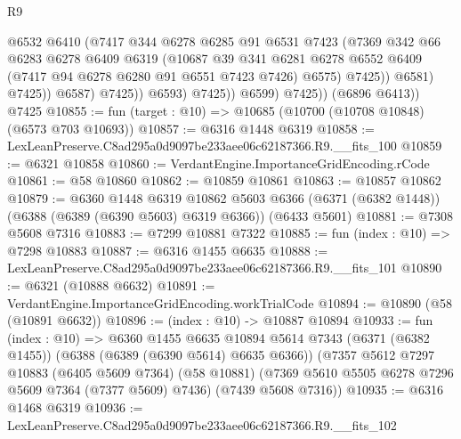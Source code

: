 \begin{lexlean}{R9}
\begin{coremodule}
                              @6532
                              @6410
                              (@7417
                                @344
                                @6278
                                @6285
                                @91
                                @6531
                                @7423
                                (@7369
                                  @342
                                  @66
                                  @6283
                                  @6278
                                  @6409
                                  @6319
                                  (@10687
                                    @39
                                    @341
                                    @6281
                                    @6278
                                    @6552
                                    @6409
                                    (@7417 @94 @6278 @6280 @91 @6551 @7423 @7426)
                                    @6575)
                                  @7425))
                              @6581)
                            @7425))
                        @6587)
                      @7425))
                  @6593)
                @7425))
            @6599)
          @7425))
      (@6896 @6413))
    @7425
@10855 := fun (target : @10) => @10685 (@10700 (@10708 @10848) (@6573 @703 @10693))
@10857 := @6316 @1448 @6319
@10858 := LexLeanPreserve.C8ad295a0d9097be233aee06c62187366.R9.__fits_100
@10859 := @6321 @10858
@10860 := VerdantEngine.ImportanceGridEncoding.rCode
@10861 := @58 @10860
@10862 := @10859 @10861
@10863 := @10857 @10862
@10879 := @6360
    @1448
    @6319
    @10862
    @5603
    @6366
    (@6371 (@6382 @1448))
    (@6388 (@6389 (@6390 @5603) @6319 @6366))
    (@6433 @5601)
@10881 := @7308 @5608 @7316
@10883 := @7299 @10881 @7322
@10885 := fun (index : @10) => @7298 @10883
@10887 := @6316 @1455 @6635
@10888 := LexLeanPreserve.C8ad295a0d9097be233aee06c62187366.R9.__fits_101
@10890 := @6321 (@10888 @6632)
@10891 := VerdantEngine.ImportanceGridEncoding.workTrialCode
@10894 := @10890 (@58 (@10891 @6632))
@10896 := (index : @10) -> @10887 @10894
@10933 := fun (index : @10) =>
  @6360
    @1455
    @6635
    @10894
    @5614
    @7343
    (@6371 (@6382 @1455))
    (@6388 (@6389 (@6390 @5614) @6635 @6366))
    (@7357
      @5612
      @7297
      @10883
      (@6405 @5609 @7364)
      (@58 @10881)
      (@7369 @5610 @5505 @6278 @7296 @5609 @7364 (@7377 @5609) @7436)
      (@7439 @5608 @7316))
@10935 := @6316 @1468 @6319
@10936 := LexLeanPreserve.C8ad295a0d9097be233aee06c62187366.R9.__fits_102

\end{coremodule}
\end{lexlean}

